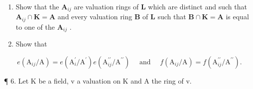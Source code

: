 \begin{enumerate}
\def\labelenumi{(\alph{enumi})}
\item
  Show that the \(\mathbf{A}_{ij}\) are valuation rings of \(\mathbf{L}\) which are distinct and such that \(\mathbf{A}_{ij} \cap \mathbf{K} = \mathbf{A}\) and every valuation ring \(\mathbf{B}\) of \(\mathbf{L}\) such that \(\mathbf{B} \cap \mathbf{K} = \mathbf{A}\) is equal to one of the \(\mathbf{A}_{ij}\) .
\item
  Show that
\end{enumerate}

\[
e \left(\mathrm{A} _ {i j} / \mathrm{A}\right) = e \left(\mathrm{A} _ {i} ^ {\prime} / \mathrm{A} ^ {\prime}\right) e \left(\mathrm{A} _ {i j} ^ {\prime \prime} / \mathrm{A} ^ {\prime \prime}\right) \quad \text { and } \quad f \left(\mathrm{A} _ {i j} / \mathrm{A}\right) = f \left(\mathrm{A} _ {i j} ^ {\prime \prime} / \mathrm{A} ^ {\prime \prime}\right).
\]

¶ 6. Let K be a field, v a valuation on K and A the ring of v.

